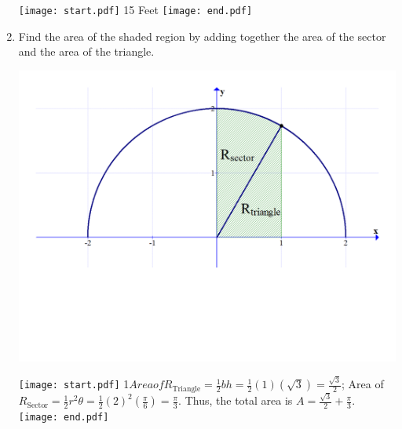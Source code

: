 \documentclass[12pt]{article}
\begin{document}
\begin{enumerate}
\texttt{[image: start.pdf]}
{15 Feet}
\texttt{[image: end.pdf]}


\item Find the area of the shaded region by adding together the area of the sector and the area of the triangle.

\begin{center}
\includegraphics[scale=0.4]{area2.pdf}
\end{center}

\texttt{[image: start.pdf]}
{{{1\linewidth}{$Area of R_{\text{Triangle}}=\frac{1}{2}bh=\frac{1}{2}(1)\left(\sqrt{3}\right)=\frac{\sqrt{3}}{2}$; Area of $R_{\text{Sector}}=\frac{1}{2}r^2\theta=\frac{1}{2}(2)^2\left(\frac{\pi}{6}\right)=\frac{\pi}{3}$.  Thus, the total area is $A= \frac{\sqrt{3}}{2}+\frac{\pi}{3}$.}}}
\texttt{[image: end.pdf]}


\end{enumerate}
\end{document}
